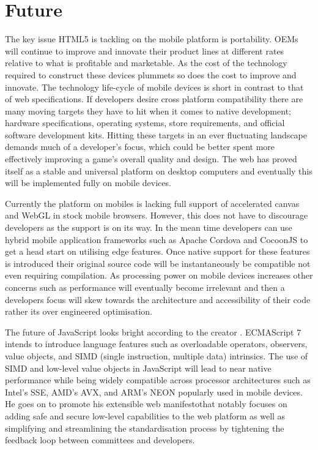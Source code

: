 \documentclass[final]{cmpreport}
\begin{document}
\section{Future}
The key issue HTML5 is tackling on the mobile platform is portability. OEMs will continue to improve and innovate their product lines at different rates relative to what is profitable and marketable. As the cost of the technology required to construct these devices plummets so does the cost to improve and innovate. The technology life-cycle of mobile devices is short in contrast to that of web specifications. If developers desire cross platform compatibility there are many moving targets they have to hit when it comes to native development; hardware specifications, operating systems, store requirements, and official software development kits. Hitting these targets in an ever fluctuating landscape demands much of a developer's focus, which could be better spent more effectively improving a game's overall quality and design. The web has proved itself as a stable and universal platform on desktop computers and eventually this will be implemented fully on mobile devices.

Currently the platform on mobiles is lacking full support of accelerated canvas and WebGL in stock mobile browsers. However, this does not have to discourage developers as the support is on its way. In the mean time developers can use hybrid mobile application frameworks such as Apache Cordova and CocoonJS to get a head start on utilising edge features. Once native support for these features is introduced their original source code will be instantaneously be compatible not even requiring compilation. As processing power on mobile devices increases other concerns such as performance will eventually become irrelevant and then a developers focus will skew towards the architecture and accessibility of their code rather its over engineered optimisation.

The future of JavaScript looks bright according to the creator \citet{Eich}. ECMAScript 7 intends to introduce language features such as overloadable operators, observers, value objects, and SIMD (single instruction, multiple data) intrinsics. The use of SIMD and low-level value objects in JavaScript will lead to near native performance while being widely compatible across processor architectures such as Intel's SSE, AMD's AVX, and ARM's NEON popularly used in mobile devices. He goes on to promote his extensible web manifesto\footnotemark that notably focuses on adding safe and secure low-level capabilities to the web platform as well as simplifying and streamlining the standardisation process by tightening the feedback loop between committees and developers.
\end{document}
